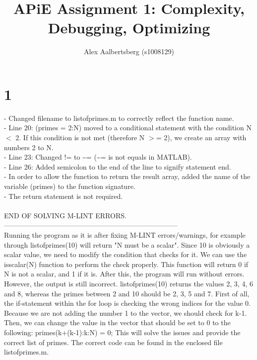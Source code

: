 \documentclass[a4paper, 12pt]{article}
\begin{document}
	\author{Alex Aalbertsberg (s1008129)}	
	\title{APiE Assignment 1: Complexity, Debugging, Optimizing}
	\maketitle
	\newpage
	\part*{1}
	- Changed filename to listofprimes.m to correctly reflect the function name.\\
	- Line 20: (primes = 2:N) moved to a conditional statement with the 
	condition N $<$ 2. If this condition is not met (therefore N $>$= 2), 
	we create an array with numbers 2 to N.\\
	- Line 23: Changed != to \textasciitilde= (\textasciitilde= is not equals in MATLAB).\\
	- Line 26: Added semicolon to the end of the line to signify statement end.\\
	- In order to allow the function to return the result array, 
	added the name of the variable (primes) to the function signature.\\
	- The return statement is not required.\\\\
	END OF SOLVING M-LINT ERRORS.\\
	---------------------------------------------------------------------------\\
	Running the program as it is after fixing M-LINT errors/warnings,
	for example through listofprimes(10) will return "N must be a scalar".
	Since 10 is obviously a scalar value, we need to modify the condition that
	checks for it. We can use the isscalar(N) function to perform the check 
	properly. This function will return 0 if N is not a scalar, and 1 if it is.
	After this, the program will run without errors.
	However, the output is still incorrect. listofprimes(10) returns the values
	2, 3, 4, 6 and 8, whereas the primes between 2 and 10 should be 2, 3, 5 and 
	7. First of all, the if-statement within the for loop is checking the wrong
	indices for the value 0. Because we are not adding the number 1 to the 
	vector, we should check for k-1. Then, we can change the value in the
	vector that should be set to 0 to the following: primes(k+(k-1):k:N) = 0;
	This will solve the issues and provide the correct list of primes. The correct code can be found in the enclosed file listofprimes.m.
	\newpage
\end{document}

